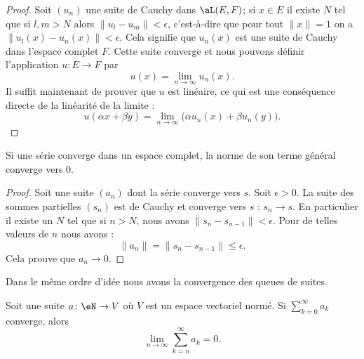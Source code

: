 \begin{proof}
	Soit \( (u_n)\) une suite de Cauchy dans \( \aL(E,F)\); si \( x\in E\) il existe \( N\) tel que si \( l,m>N\) alors \( \| u_l-u_m \|<\epsilon\), c'est-à-dire que pour tout \( \| x \|=1\) on a \( \| u_l(x)-u_n(x) \|<\epsilon\). Cela signifie que \( u_n(x)\) est une suite de Cauchy dans l'espace complet \( F\). Cette suite converge et nous pouvons définir l'application \( u\colon E\to F\) par
	\begin{equation}
		u(x)=\lim_{n\to \infty} u_n(x).
	\end{equation}
	Il suffit maintenant de prouver que \( u\) est linéaire, ce qui est une conséquence directe de la linéarité de la limite :
	\begin{equation}
		u(\alpha x+\beta y)=\lim_{n\to \infty} \big( \alpha u_n(x)+\beta u_n(y) \big).
	\end{equation}
\end{proof}

\begin{proposition}  \label{PROPooYDFUooTGnYQg}
	Si une série converge dans un espace complet, la norme de son terme général converge vers \( 0\).
\end{proposition}

\begin{proof}
	Soit une suite \( (a_n)\) dont la série converge vers \( s\). Soit \( \epsilon>0\). La suite des sommes partielles \( (s_n)\) est de Cauchy et converge vers \( s\) : \( s_n\to s\). En particulier il existe un \( N\) tel que si \( n>N\), nous avons \( \| s_n-s_{n-1} \|<\epsilon\). Pour de telles valeurs de \( n\) nous avons :
	\begin{equation}
		\| a_n \|=\| s_n-s_{n-1} \|\leq \epsilon.
	\end{equation}
	Cela prouve que \( a_n\to 0\).
\end{proof}

Dans le même ordre d'idée nous avons la convergence des queues de suites.

\begin{lemma}       \label{LEMooFUCOooCOqLRj}
    Soit une suite \( a\colon \eN\to V\) où \( V\) est un espace vectoriel normé. Si \( \sum_{k=0}^{\infty}a_k\) converge, alors
	\begin{equation}
		\lim_{n\to \infty} \sum_{k=n}^{\infty}a_k=0.
	\end{equation}
\end{lemma}

